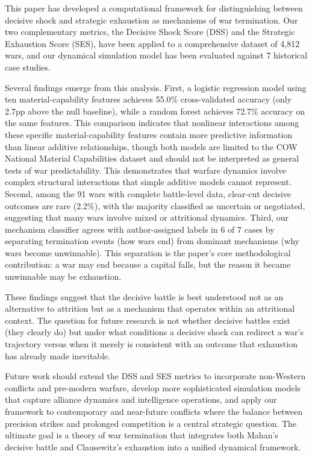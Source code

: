 This paper has developed a computational framework for distinguishing between decisive shock and strategic exhaustion as mechanisms of war termination. Our two complementary metrics, the Decisive Shock Score (DSS) and the Strategic Exhaustion Score (SES), have been applied to a comprehensive dataset of 4,812 wars, and our dynamical simulation model has been evaluated against 7 historical case studies.

Several findings emerge from this analysis. First, a logistic regression model using ten material-capability features achieves 55.0\% cross-validated accuracy (only 2.7pp above the null baseline), while a random forest achieves 72.7\% accuracy on the same features. This comparison indicates that nonlinear interactions among these specific material-capability features contain more predictive information than linear additive relationships, though both models are limited to the COW National Material Capabilities dataset and should not be interpreted as general tests of war predictability. This demonstrates that warfare dynamics involve complex structural interactions that simple additive models cannot represent. Second, among the 91 wars with complete battle-level data, clear-cut decisive outcomes are rare (2.2\%), with the majority classified as uncertain or negotiated, suggesting that many wars involve mixed or attritional dynamics. Third, our mechanism classifier agrees with author-assigned labels in 6 of 7 cases by separating termination events (how wars end) from dominant mechanisms (why wars become unwinnable). This separation is the paper's core methodological contribution: a war may end because a capital falls, but the reason it became unwinnable may be exhaustion.

These findings suggest that the decisive battle is best understood not as an alternative to attrition but as a mechanism that operates within an attritional context. The question for future research is not whether decisive battles exist (they clearly do) but under what conditions a decisive shock can redirect a war's trajectory versus when it merely is consistent with an outcome that exhaustion has already made inevitable.

Future work should extend the DSS and SES metrics to incorporate non-Western conflicts and pre-modern warfare, develop more sophisticated simulation models that capture alliance dynamics and intelligence operations, and apply our framework to contemporary and near-future conflicts where the balance between precision strikes and prolonged competition is a central strategic question. The ultimate goal is a theory of war termination that integrates both Mahan's decisive battle and Clausewitz's exhaustion into a unified dynamical framework.
